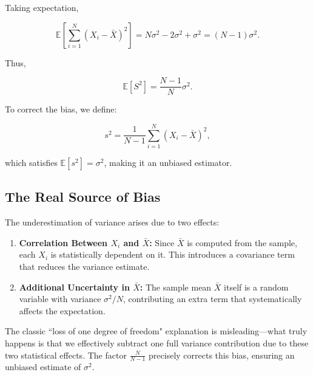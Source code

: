 \documentclass{article}
\begin{document}
Taking expectation,

\begin{equation}
    \mathbb{E} \left[ \sum_{i=1}^{N} (X_i - \bar{X})^2 \right] = N\sigma^2 - 2 \sigma^2 + \sigma^2 = (N-1) \sigma^2.
\end{equation}

Thus,

\begin{equation}
    \mathbb{E}[S^2] = \frac{N-1}{N} \sigma^2.
\end{equation}

To correct the bias, we define:

\begin{equation}
    s^2 = \frac{1}{N-1} \sum_{i=1}^{N} (X_i - \bar{X})^2,
\end{equation}

which satisfies \( \mathbb{E}[s^2] = \sigma^2 \), making it an unbiased estimator.

\subsection{The Real Source of Bias}
The underestimation of variance arises due to two effects:
\begin{enumerate}
    \item \textbf{Correlation Between \( X_i \) and \( \bar{X} \):} Since \( \bar{X} \) is computed from the sample, each \( X_i \) is statistically dependent on it. This introduces a covariance term that reduces the variance estimate.
    \item \textbf{Additional Uncertainty in \( \bar{X} \):} The sample mean \( \bar{X} \) itself is a random variable with variance \( \sigma^2/N \), contributing an extra term that systematically affects the expectation.
\end{enumerate}

The classic ``loss of one degree of freedom" explanation is misleading—what truly happens is that we effectively subtract one full variance contribution due to these two statistical effects. The factor \( \frac{N}{N-1} \) precisely corrects this bias, ensuring an unbiased estimate of \( \sigma^2 \).
\end{document}

